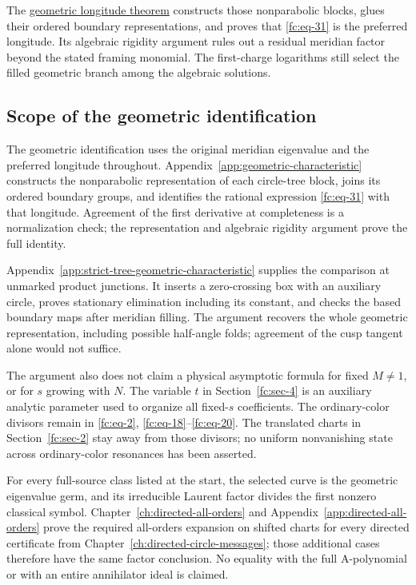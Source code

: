 The \hyperref[app:geometric-characteristic]{geometric longitude theorem} constructs those nonparabolic blocks, glues their ordered boundary representations, and proves that \eqref{fc:eq-31} is the preferred longitude. Its algebraic rigidity argument rules out a residual meridian factor beyond the stated framing monomial. The first-charge logarithms still select the filled geometric branch among the algebraic solutions.

\subsection{Scope of the geometric identification}\label{fc:sec-7-3}

The geometric identification uses the original meridian eigenvalue and the preferred longitude throughout. Appendix~\ref{app:geometric-characteristic} constructs the nonparabolic representation of each circle-tree block, joins its ordered boundary groups, and identifies the rational expression \eqref{fc:eq-31} with that longitude. Agreement of the first derivative at completeness is a normalization check; the representation and algebraic rigidity argument prove the full identity.

Appendix~\ref{app:strict-tree-geometric-characteristic} supplies the comparison at unmarked product junctions. It inserts a zero-crossing box with an auxiliary circle, proves stationary elimination including its constant, and checks the based boundary maps after meridian filling. The argument recovers the whole geometric representation, including possible half-angle folds; agreement of the cusp tangent alone would not suffice.

The argument also does not claim a physical asymptotic formula for fixed \(M\ne1\), or for \(s\) growing with \(N\). The variable \(t\) in Section~\ref{fc:sec-4} is an auxiliary analytic parameter used to organize all fixed-\(s\) coefficients. The ordinary-color divisors remain in \eqref{fc:eq-2}, \eqref{fc:eq-18}--\eqref{fc:eq-20}. The translated charts in Section~\ref{fc:sec-2} stay away from those divisors; no uniform nonvanishing state across ordinary-color resonances has been asserted.

For every full-source class listed at the start, the selected curve is the geometric eigenvalue germ, and its irreducible Laurent factor divides the first nonzero classical symbol. Chapter~\ref{ch:directed-all-orders} and Appendix~\ref{app:directed-all-orders} prove the required all-orders expansion on shifted charts for every directed certificate from Chapter~\ref{ch:directed-circle-messages}; those additional cases therefore have the same factor conclusion. No equality with the full A-polynomial or with an entire annihilator ideal is claimed.
